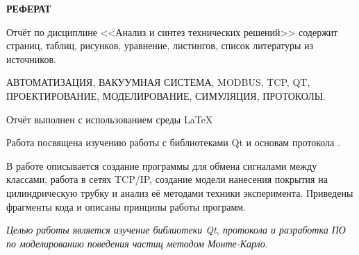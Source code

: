 \documentclass[../AISTR.tex]{subfiles}
\begin{document}
	\begin{center}
		\normalsize\bfseries\MakeUppercase{РЕФЕРАТ}
	\end{center}

Отчёт по дисциплине <<Анализ и синтез технических решений>> содержит \pageref{LastPage} страниц, \totaltables \xspace таблиц, \totalfigures \xspace рисунков, \totalequations \xspace уравнение, \totallstlistings \xspace листингов, список литературы из  источников. 

АВТОМАТИЗАЦИЯ, ВАКУУМНАЯ СИСТЕМА, MODBUS, TCP, QT, ПРОЕКТИРОВАНИЕ, МОДЕЛИРОВАНИЕ, СИМУЛЯЦИЯ, ПРОТОКОЛЫ.

Отчёт выполнен с использованием среды \LaTeX

Работа посвящена изучению работы с библиотеками Qt и основам протокола \mb.

В работе описывается создание программы для обмена сигналами между классами, работа в сетях TCP/IP, создание модели нанесения покрытия на цилиндрическую трубку и анализ её методами техники эксперимента. Приведены фрагменты кода и описаны принципы работы программ.


	
\textit{Целью работы является изучение библиотеки Qt, протокола \mb и разработка ПО по моделированию поведения частиц методом Монте-Карло.}
	
\end{document}
